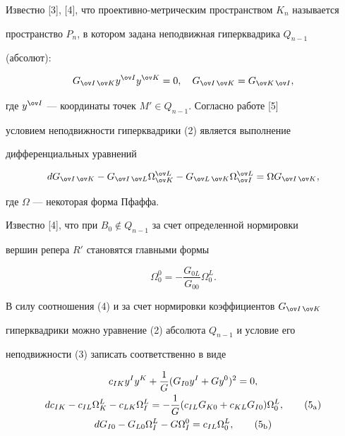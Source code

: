 \addtocounter{equation}{1}





\notag{}Известно [3], [4], что проективно-метрическим пространством $K_n$ называется 


пространство $P_n$, в котором задана неподвижная гиперквадрика $Q_{n-1}$ 


(абсолют): 


\begin{equation} 


G_{\ov I\,\ov K}y^{\ov I}y^{\ov K}=0,\quad 


G_{\ov I\,\ov K}=G_{\ov K\,\ov I}, 


\end{equation} 


где $y^{\ov I}$ --- координаты точек $M'\in Q_{n-1}$. Согласно работе [5] 


условием неподвижности гиперквадрики (2) является выполнение 


дифференциальных уравнений 


\begin{equation} 


dG_{\ov I\,\ov K}-G_{\ov I\,\ov L}\Omega^{\ov L}_{\ov K}- 


G_{\ov L\,\ov K}\Omega^{\ov L}_{\ov I}= \Omega G_{\ov I\,\ov K}, 


\end{equation} 


где $\Omega$ --- некоторая форма Пфаффа. 


 


Известно [4], что при $B_0\notin Q_{n-1}$ за счет определенной нормировки 


вершин репера $R'$ становятся главными формы 


\begin{equation} 


\Omega^0_0=-\frac{G_{0L}}{G_{00}}\Omega^L_0. 


\end{equation} 


В силу соотношения (4) и за счет нормировки коэффициентов $G_{\ov I\,\ov K}$ 


гиперквадрики можно уравнение (2) абсолюта $Q_{n-1}$ и условие его 


неподвижности (3) записать соответственно в виде 


\begin{gather} 


c_{IK}y^I y^K+\frac{1}{G}(G_{I0}y^I+G y^0)^2=0,\notag\\ 


% 


dc_{IK}-c_{IL}\Omega^L_K-c_{LK}\Omega^L_I=-\frac{1}{G} 


(c_{IL}G_{K0}+c_{KL}G_{I0})\Omega^L_0, \tag{5${}_{\mathrm a}$} \\ 


% 


dG_{I0}-G_{L0}\Omega^L_I-G\Omega^0_I= 


c_{IL}\Omega^L_0,\tag{5${}_{\mathrm b}$} 


\end{gather} 


